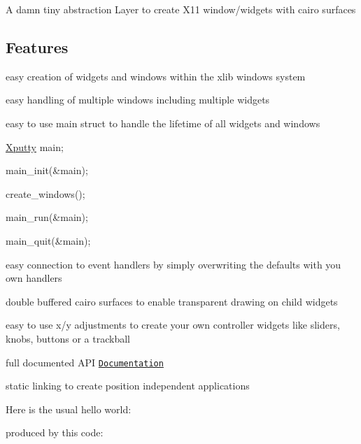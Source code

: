 A damn tiny abstraction Layer to create X11 window/widgets with cairo surfaces

\subsection*{Features}


\begin{DoxyItemize}
\item easy creation of widgets and windows within the xlib windows system
\item easy handling of multiple windows including multiple widgets
\item easy to use main struct to handle the lifetime of all widgets and windows
\begin{DoxyItemize}
\item \hyperlink{structXputty}{Xputty} main;
\item main\+\_\+init(\&main);
\item create\+\_\+windows();
\item main\+\_\+run(\&main);
\item main\+\_\+quit(\&main);
\end{DoxyItemize}
\item easy connection to event handlers by simply overwriting the defaults with you own handlers
\item double buffered cairo surfaces to enable transparent drawing on child widgets
\item easy to use x/y adjustments to create your own controller widgets like sliders, knobs, buttons or a trackball
\item full documented A\+PI \href{https://brummer10.github.io/Xputty/html/index.html}{\tt Documentation}
\item static linking to create position independent applications
\end{DoxyItemize}

Here is the usual hello world\+:



produced by this code\+:



